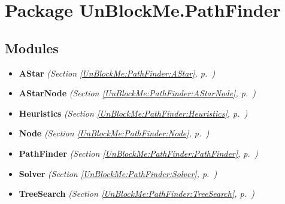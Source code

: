 %
%
%


\section{Package UnBlockMe.PathFinder}

    \label{UnBlockMe:PathFinder}


\subsection{Modules}

\begin{itemize}
\setlength{\parskip}{0ex}
\item \textbf{AStar}
  \textit{(Section \ref{UnBlockMe:PathFinder:AStar}, p.~\pageref{UnBlockMe:PathFinder:AStar})}

\item \textbf{AStarNode}
  \textit{(Section \ref{UnBlockMe:PathFinder:AStarNode}, p.~\pageref{UnBlockMe:PathFinder:AStarNode})}

\item \textbf{Heuristics}
  \textit{(Section \ref{UnBlockMe:PathFinder:Heuristics}, p.~\pageref{UnBlockMe:PathFinder:Heuristics})}

\item \textbf{Node}
  \textit{(Section \ref{UnBlockMe:PathFinder:Node}, p.~\pageref{UnBlockMe:PathFinder:Node})}

\item \textbf{PathFinder}
  \textit{(Section \ref{UnBlockMe:PathFinder:PathFinder}, p.~\pageref{UnBlockMe:PathFinder:PathFinder})}

\item \textbf{Solver}
  \textit{(Section \ref{UnBlockMe:PathFinder:Solver}, p.~\pageref{UnBlockMe:PathFinder:Solver})}

\item \textbf{TreeSearch}
  \textit{(Section \ref{UnBlockMe:PathFinder:TreeSearch}, p.~\pageref{UnBlockMe:PathFinder:TreeSearch})}

\end{itemize}


